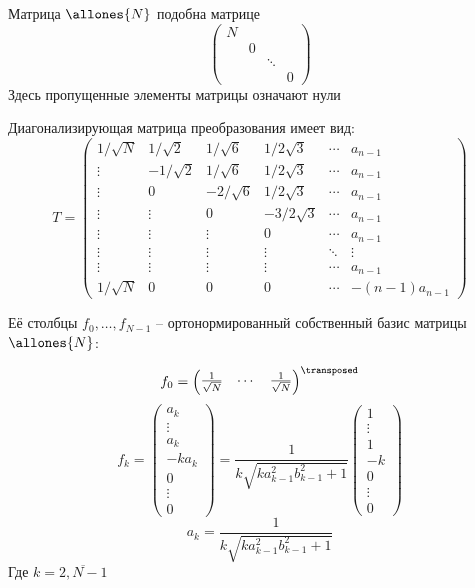 \begin{propose}
    Матрица \( \allones{N} \) подобна матрице
    \[
        \begin{pmatrix}
        N &   &        & \\
          & 0 &        & \\
          &   & \ddots & \\
          &   &        & 0
        \end{pmatrix}
    \]
Здесь пропущенные элементы матрицы означают нули

    Диагонализирующая матрица преобразования имеет вид:
    \begin{equation}\label{eq:diagtransform}
    T =
    \begin{pmatrix}
        1/\sqrt N &  1/\sqrt2 & 1/\sqrt6  & 1/2\sqrt3  & \cdots & a_{n-1} \\
        \vdots    & -1/\sqrt2 & 1/\sqrt6  & 1/2\sqrt3  & \cdots & a_{n-1} \\
        \vdots    & 0         & -2/\sqrt6 & 1/2\sqrt3  & \cdots & a_{n-1} \\
        \vdots    & \vdots    & 0         & -3/2\sqrt3 & \cdots & a_{n-1} \\
        \vdots    & \vdots    & \vdots    & 0          & \cdots & a_{n-1} \\
        \vdots    & \vdots    & \vdots    & \vdots     & \ddots & \vdots  \\
        \vdots    & \vdots    & \vdots    & \vdots     & \cdots & a_{n-1} \\
        1/\sqrt N & 0         & 0         & 0          & \cdots & -(n-1)a_{n-1}
        \end{pmatrix}
        \end{equation}

        \begin{minipage}{\textwidth}
            Её столбцы \( f_0, \ldots, f_{N-1} \) -- ортонормированный собственный базис матрицы \( \allones{N} \):

    \[f_0 = \begin{pmatrix} \frac{1}{\sqrt N} & \cdots & \frac{1}{\sqrt N} \end{pmatrix}^\transposed\]
    \providecommand{\fknorm}{\sqrt{k a_{k-1}^2 b_{k-1}^2 + 1}}
    \[
        f_k =
        \begin{pmatrix}a_k \\ \vdots \\ a_k \\ -ka_k \\ 0 \\ \vdots \\ 0 \end{pmatrix} =
        \frac{1}{k\fknorm}
        \begin{pmatrix}1 \\ \vdots \\ 1 \\ -k \\ 0 \\ \vdots \\ 0 \end{pmatrix}
        \]
    \[
         a_k = \frac{1}{k\fknorm}
         \]
         Где \( k=\overline{2,N-1} \)


\end{minipage}
\end{propose}
